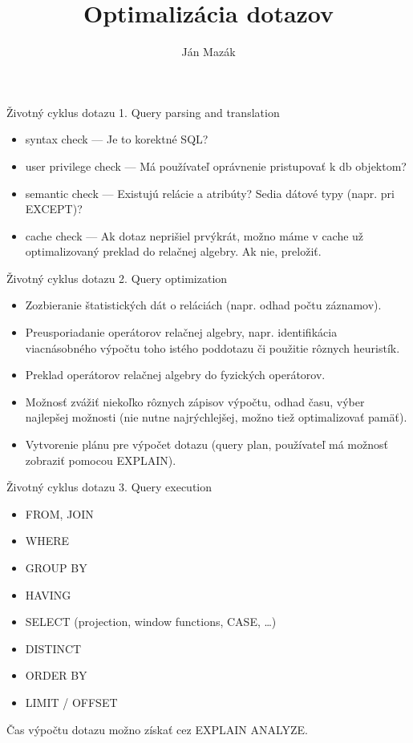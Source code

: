 \documentclass[12pt]{beamer}
\title{Optimalizácia dotazov}
\author{Ján Mazák}
\institute{FMFI UK Bratislava}
\date{}
\begin{document}
\frame{\titlepage}

\begin{frame}[fragile]{Životný cyklus dotazu}
1. Query parsing and translation
\begin{itemize}
  \item syntax check --- Je to korektné SQL?
  \item user privilege check --- Má používateľ oprávnenie pristupovať k db objektom?
  \item semantic check --- Existujú relácie a atribúty? Sedia dátové typy (napr. pri EXCEPT)?
  \item cache check --- Ak dotaz neprišiel prvýkrát,
      možno máme v cache už optimalizovaný preklad do relačnej algebry. Ak nie, preložiť.
\end{itemize}
\end{frame}

\begin{frame}[fragile]{Životný cyklus dotazu}
2. Query optimization
\begin{itemize}
  \item Zozbieranie štatistických dát o reláciách (napr. odhad počtu záznamov).
  \item Preusporiadanie operátorov relačnej algebry,
      napr. identifikácia viacnásobného výpočtu toho istého poddotazu či použitie rôznych heuristík.
  \item Preklad operátorov relačnej algebry do fyzických operátorov.
  \item Možnosť zvážiť niekoľko rôznych zápisov výpočtu, odhad času, výber najlepšej možnosti
      (nie nutne najrýchlejšej, možno tiež optimalizovať pamäť).
  \item Vytvorenie plánu pre výpočet dotazu (query plan, používateľ má možnosť zobraziť pomocou EXPLAIN).
\end{itemize}
\end{frame}

\begin{frame}[fragile]{Životný cyklus dotazu}
3. Query execution
\begin{itemize}
  \item FROM, JOIN
  \item WHERE
  \item GROUP BY
  \item HAVING
  \item SELECT (projection, window functions, CASE, \dots)
  \item DISTINCT
  \item ORDER BY
  \item LIMIT / OFFSET
\end{itemize}
Čas výpočtu dotazu možno získať cez EXPLAIN ANALYZE.
\end{frame}
\end{document}
